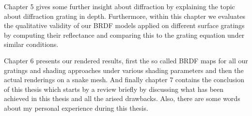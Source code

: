 Chapter 5 gives some further insight about diffraction by explaining the topic about diffraction grating in depth. Furthermore, within this chapter we evaluates the qualitative validity of our BRDF models applied on different surface gratings by computing their reflectance and comparing this to the grating equation under similar conditions. 

Chapter 6 presents our rendered results, first the so called BRDF maps for all our gratings and shading approaches under various shading parameters and then the actual renderings on a snake mesh. And finally chapter 7 contains the conclusion of this thesis which starts by a review briefly by discussing what has been achieved in this thesis and all the arised drawbacks. Also, there are some words about my personal experience during this thesis.

